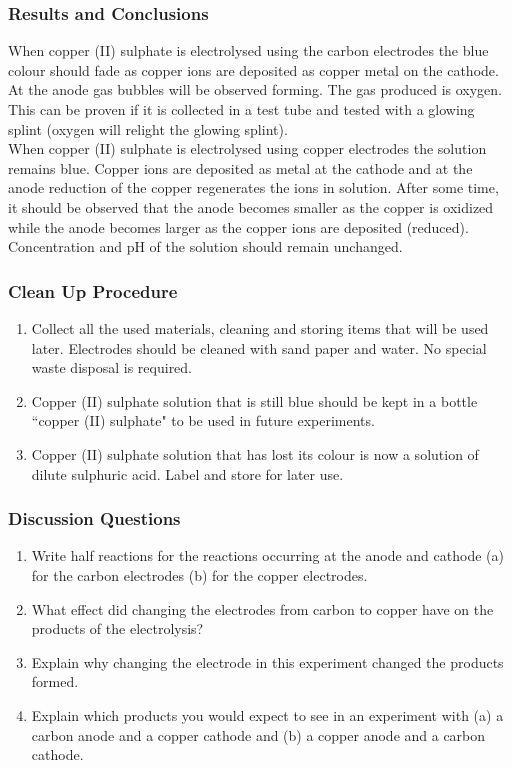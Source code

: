 \subsubsection*{Results and Conclusions}
When copper (II) sulphate is electrolysed using the carbon electrodes the blue colour should fade as copper ions are deposited as copper metal on the cathode.  At the anode gas bubbles will be observed forming. The gas produced is oxygen. This can be proven if it is collected in a test tube and tested with a glowing splint (oxygen will relight the glowing splint).
\\When copper (II) sulphate is electrolysed using copper electrodes the solution remains blue. Copper ions are deposited as metal at the cathode and at the anode reduction of the copper regenerates the ions in solution. After some time, it should be observed that the anode becomes smaller as the copper is oxidized while the anode becomes larger as the copper ions are deposited (reduced). Concentration and pH of the solution should remain unchanged.

\subsubsection*{Clean Up Procedure}
\begin{enumerate}
\item{Collect all the used materials, cleaning and storing items that will be used later. Electrodes should be cleaned with sand paper and water. No special waste disposal is required.}
\item{Copper (II) sulphate solution that is still blue should be kept in a bottle ``copper (II) sulphate" to be used in future experiments.}
\item{Copper (II) sulphate solution that has lost its colour is now a solution of dilute sulphuric acid. Label and store for later use.}
\end{enumerate}

\subsubsection*{Discussion Questions}
\begin{enumerate}
\item{Write half reactions for the reactions occurring at the anode and cathode (a) for the carbon electrodes (b) for the copper electrodes.}
\item{What effect did changing the electrodes from carbon to copper have on the products of the electrolysis?}
\item{Explain why changing the electrode in this experiment changed the products formed.}
\item{Explain which products you would expect to see in an experiment with (a) a carbon anode and a copper cathode and (b) a copper anode and a carbon cathode.}
\end{enumerate}

